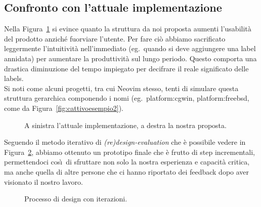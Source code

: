 \documentclass[12pt]{article} %
\begin{document}
\subsection{Confronto con l'attuale implementazione}
Nella Figura~\ref{fig:confronto} si evince quanto la struttura da noi proposta aumenti l'usabilit\`a del prodotto anzich\'e fuorviare l'utente. Per fare ci\`o abbiamo sacrificato leggermente l'intuitivit\`a nell'immediato (eg.\ quando si deve aggiungere una label annidata) per aumentare la produttivit\`a sul lungo periodo. Questo comporta una drastica diminuzione del tempo impiegato per decifrare il reale significato delle labels.\\
Si noti come alcuni progetti, tra cui Neovim stesso, tenti di simulare questa struttura gerarchica componendo i nomi (eg.\ platform:cgwin, platform:freebsd, come da Figura~\ref{fig:cattivoesempio2}).

\begin{figure}[H]
\caption{A sinistra l'attuale implementazione, a destra la nostra proposta.}
\label{fig:confronto}
\end{figure}

Seguendo il metodo iterativo di \emph{(re)design-evaluation} che \`e possibile vedere in Figura~\ref{fig:ciclo}, abbiamo ottenuto un prototipo finale che \`e frutto di step incrementali, permettendoci cos\`\i\ di sfruttare non solo la nostra esperienza e capacit\`a critica, ma anche quella di altre persone che ci hanno riportato dei feedback dopo aver visionato il nostro lavoro.

\begin{figure}[H]
\caption{Processo di design con iterazioni.}
\label{fig:ciclo}
\end{figure}
\end{document}
